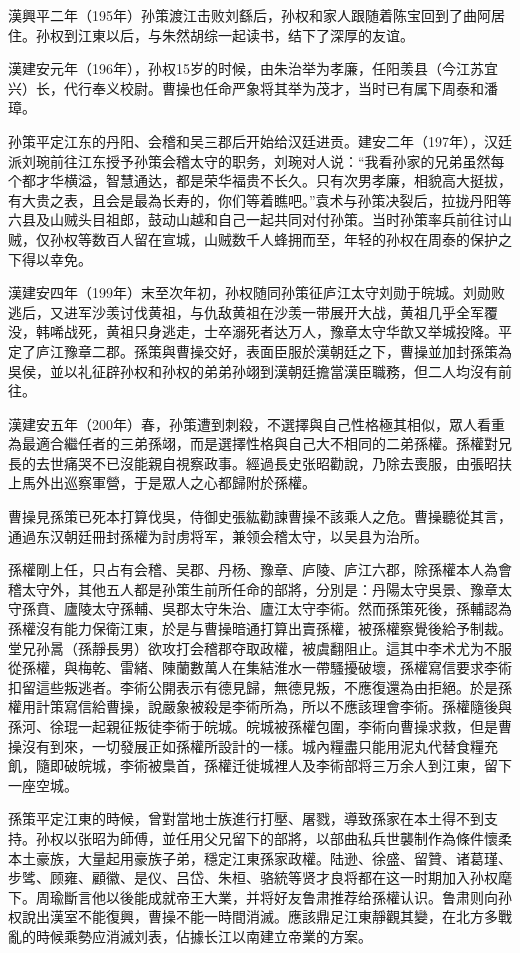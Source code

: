 漢興平二年（195年）孙策渡江击败刘繇后，孙权和家人跟随着陈宝回到了曲阿居住。孙权到江東以后，与朱然胡综一起读书，结下了深厚的友谊。

漢建安元年（196年），孙权15岁的时候，由朱治举为孝廉，任阳羡县（今江苏宜兴）长，代行奉义校尉。曹操也任命严象将其举为茂才，当时已有属下周泰和潘璋。

孙策平定江东的丹阳、会稽和吴三郡后开始给汉廷进贡。建安二年（197年），汉廷派刘琬前往江东授予孙策会稽太守的职务，刘琬对人说：“我看孙家的兄弟虽然每个都才华横溢，智慧通达，都是荣华福贵不长久。只有次男孝廉，相貌高大挺拔，有大贵之表，且会是最為长寿的，你们等着瞧吧。”袁术与孙策决裂后，拉拢丹阳等六县及山贼头目祖郎，鼓动山越和自己一起共同对付孙策。当时孙策率兵前往讨山贼，仅孙权等数百人留在宣城，山贼数千人蜂拥而至，年轻的孙权在周泰的保护之下得以幸免。

漢建安四年（199年）末至次年初，孙权随同孙策征庐江太守刘勋于皖城。刘勋败逃后，又进军沙羡讨伐黄祖，与仇敌黄祖在沙羡一带展开大战，黄祖几乎全军覆没，韩唏战死，黄祖只身逃走，士卒溺死者达万人，豫章太守华歆又举城投降。平定了庐江豫章二郡。孫策與曹操交好，表面臣服於漢朝廷之下，曹操並加封孫策為吳侯，並以礼征辟孙权和孙权的弟弟孙翊到漢朝廷擔當漢臣職務，但二人均沒有前往。

漢建安五年（200年）春，孙策遭到刺殺，不選擇與自己性格極其相似，眾人看重為最適合繼任者的三弟孫翊，而是選擇性格與自己大不相同的二弟孫權。孫權對兄長的去世痛哭不已沒能親自視察政事。經過長史张昭勸說，乃除去喪服，由張昭扶上馬外出巡察軍營，于是眾人之心都歸附於孫權。

曹操見孫策已死本打算伐吳，侍御史張紘勸諫曹操不該乘人之危。曹操聽從其言，通過东汉朝廷冊封孫權为討虏将军，兼领会稽太守，以吴县为治所。

孫權剛上任，只占有会稽、吴郡、丹杨、豫章、庐陵、庐江六郡，除孫權本人為會稽太守外，其他五人都是孙策生前所任命的部將，分別是：丹陽太守吳景、豫章太守孫賁、廬陵太守孫輔、吳郡太守朱治、廬江太守李術。然而孫策死後，孫輔認為孫權沒有能力保衛江東，於是与曹操暗通打算出賣孫權，被孫權察覺後給予制裁。堂兄孙暠（孫靜長男）欲攻打会稽郡夺取政權，被虞翻阻止。這其中李术尤为不服從孫權，與梅乾、雷緒、陳蘭數萬人在集結淮水一帶騷擾破壞，孫權寫信要求李術扣留這些叛逃者。李術公開表示有德見歸，無德見叛，不應復還為由拒絕。於是孫權用計策寫信給曹操，說嚴象被殺是李術所為，所以不應該理會李術。孫權隨後與孫河、徐琨一起親征叛徒李術于皖城。皖城被孫權包圍，李術向曹操求救，但是曹操沒有到來，一切發展正如孫權所設計的一樣。城內糧盡只能用泥丸代替食糧充飢，隨即破皖城，李術被梟首，孫權迁徙城裡人及李術部将三万余人到江東，留下一座空城。

孫策平定江東的時候，曾對當地士族進行打壓、屠戮，導致孫家在本土得不到支持。孙权以张昭为師傅，並任用父兄留下的部將，以部曲私兵世襲制作為條件懷柔本土豪族，大量起用豪族子弟，穩定江東孫家政權。陆逊、徐盛、留贊、诸葛瑾、步骘、顾雍、顧徽、是仪、吕岱、朱桓、骆統等贤才良将都在这一时期加入孙权麾下。周瑜斷言他以後能成就帝王大業，并将好友鲁肃推荐给孫權认识。鲁肃则向孙权說出漢室不能復興，曹操不能一時間消滅。應該鼎足江東靜觀其變，在北方多戰亂的時候乘勢应消滅刘表，佔據长江以南建立帝業的方案。

